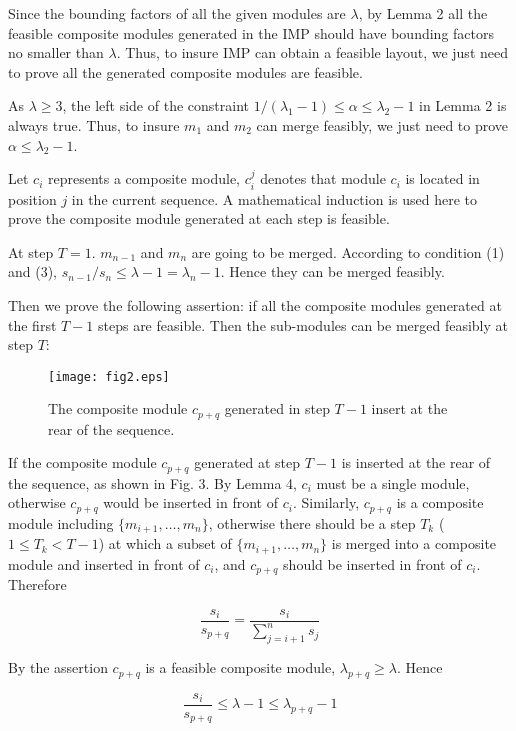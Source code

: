 \documentclass[conference]{IEEEtran}
\begin{document}
\begin{IEEEproof}
Since the bounding factors of all the given modules are $\lambda$, by Lemma 2 all the feasible composite modules generated in the IMP should have bounding factors no smaller than $\lambda$. Thus, to insure IMP can obtain a feasible layout, we just need to prove all the generated composite modules are feasible.

As $\lambda \ge 3$, the left side of the constraint $1/(\lambda_1-1) \le \alpha \le \lambda_2-1$ in Lemma 2 is always true. Thus, to insure $m_1$ and $m_2$ can merge feasibly, we just need to prove $\alpha \le \lambda_2-1$.

Let $c_i$ represents a composite module, $c_i^j$ denotes that module $c_i$ is located in position $j$ in the current sequence. A mathematical induction is used here to prove the composite module generated at each step is feasible.

At step $T=1$. $m_{n-1}$ and $m_n$ are going to be merged. According to condition (1) and (3), $s_{n-1}/s_n  \le \lambda-1= \lambda_n-1 $. Hence they can be merged feasibly.

Then we prove the following assertion: if all the composite modules generated at the first $T-1$ steps are feasible. Then the sub-modules can be merged feasibly at step $T$:

\begin{figure}[!t]
\centering
\texttt{[image: fig2.eps]}
\caption{The composite module $c_{p+q}$ generated in step $T-1$ insert at the rear of the sequence.}
\label{fig_sim}
\end{figure}

If the composite module $c_{p+q}$ generated at step $T-1$ is inserted at the rear of the sequence, as shown in Fig. 3. By Lemma 4, $c_i$ must be a single module, otherwise $c_{p+q}$ would be inserted in front of $c_i$. Similarly, $c_{p+q}$ is a composite module including $\{m_{i+1},\ldots,m_n\}$, otherwise there should be a step $T_k$ ($1 \le T_k < T-1$) at which a subset of $\{m_{i+1},\ldots,m_n\}$ is merged into a composite module and inserted in front of $c_i$, and $c_{p+q}$ should be inserted in front of $c_i$. Therefore

$$ \frac{s_i}{s_{p+q}} = \frac{s_i}{\sum_{j=i+1}^n s_j}$$

By the assertion $c_{p+q}$ is a feasible composite module, $\lambda_{p+q} \ge \lambda$. Hence

$$ \frac{s_i}{s_{p+q}} \le \lambda-1 \le \lambda_{p+q}-1$$



\end{IEEEproof}
\end{document}
